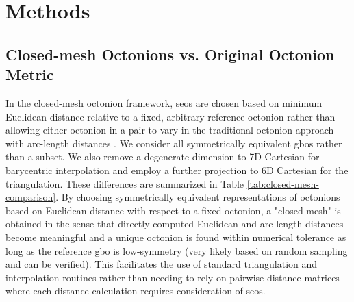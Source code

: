 \documentclass[preprint,12pt]{elsarticle}
\begin{document}
\section{Methods} \label{sec:methods}

\subsection{Closed-mesh Octonions vs. Original Octonion Metric} \label{sec:methods:closed-mesh}

In the closed-mesh octonion framework, \glspl{seo} are chosen based on minimum Euclidean distance relative to a fixed, arbitrary reference octonion rather than allowing either octonion in a pair to vary in the traditional octonion approach with arc-length distances \cite{Francis2019ABoundaries}. We consider all symmetrically equivalent \glspl{gbo} rather than a subset. We also remove a degenerate dimension to 7D Cartesian for barycentric interpolation and employ a further projection to 6D Cartesian for the triangulation. These differences are summarized in Table \ref{tab:closed-mesh-comparison}. By choosing symmetrically equivalent representations of octonions based on Euclidean distance with respect to a fixed octonion, a "closed-mesh" is obtained in the sense that directly computed Euclidean and arc length distances become meaningful and a unique octonion is found within numerical tolerance as long as the reference \gls{gbo} is low-symmetry (very likely based on random sampling and can be verified). This facilitates the use of standard triangulation and interpolation routines rather than needing to rely on pairwise-distance matrices where each distance calculation requires consideration of \glspl{seo}.

  
\end{document}
